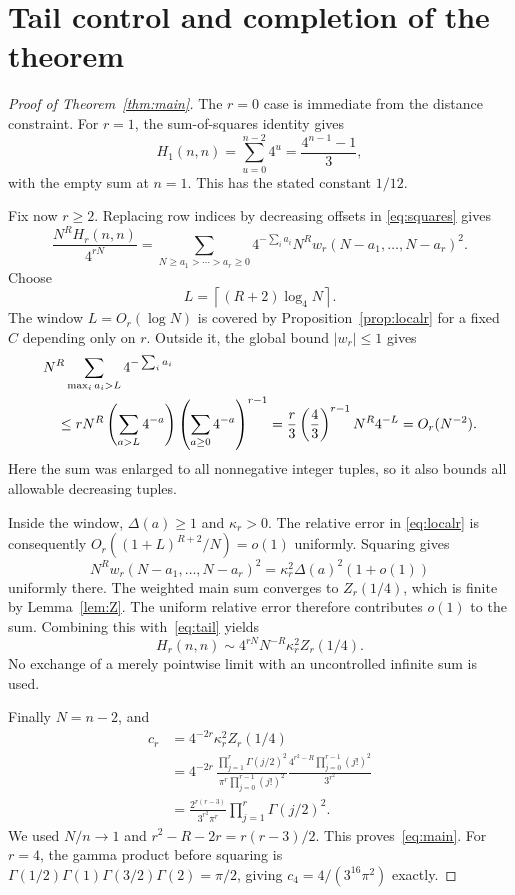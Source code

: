 \documentclass[11pt]{article}
\theoremstyle{remark}
\begin{document}
\section{Tail control and completion of the theorem}

\begin{proof}[Proof of Theorem~\ref{thm:main}]
The $r=0$ case is immediate from the distance constraint. For $r=1$, the
sum-of-squares identity gives
\[
 H_1(n,n)=\sum_{u=0}^{n-2}4^u=\frac{4^{n-1}-1}{3},
\]
with the empty sum at $n=1$. This has the stated constant $1/12$.

Fix now $r\ge2$. Replacing row indices by decreasing offsets in
\eqref{eq:squares} gives
\begin{equation}\label{eq:normalH}
 \frac{N^RH_r(n,n)}{4^{rN}}
 =\sum_{N\ge a_1>\cdots>a_r\ge0}
       4^{-\sum_i a_i}N^Rw_r(N-a_1,\ldots,N-a_r)^2.
\end{equation}
Choose
\[
 L=\left\lceil(R+2)\log_4 N\right\rceil.
\]
The window $L=O_r(\log N)$ is covered by Proposition~\ref{prop:localr} for a
fixed $C$ depending only on $r$. Outside it, the global bound $|w_r|\le1$ gives
\begin{align}
 &N^R\sum_{\max_i a_i>L}4^{-\sum_i a_i}\notag\\
 &\quad\le rN^R\left(\sum_{a>L}4^{-a}\right)
                     \left(\sum_{a\ge0}4^{-a}\right)^{r-1}
 =\frac r3\left(\frac43\right)^{r-1}N^R4^{-L}
 =O_r(N^{-2}).\label{eq:tail}
\end{align}
Here the sum was enlarged to all nonnegative integer tuples, so it also bounds
all allowable decreasing tuples.

Inside the window, $\Delta(a)\ge1$ and $\kappa_r>0$. The relative error in
\eqref{eq:localr} is consequently
$O_r((1+L)^{R+2}/N)=o(1)$ uniformly. Squaring gives
\[
 N^Rw_r(N-a_1,\ldots,N-a_r)^2
 =\kappa_r^2\Delta(a)^2(1+o(1))
\]
uniformly there. The weighted main sum converges to $Z_r(1/4)$, which is finite
by Lemma~\ref{lem:Z}. The uniform relative error therefore contributes $o(1)$
to the sum. Combining this with~\eqref{eq:tail} yields
\begin{equation}\label{eq:Nlimit}
 H_r(n,n)\sim4^{rN}N^{-R}\kappa_r^2 Z_r(1/4).
\end{equation}
No exchange of a merely pointwise limit with an uncontrolled infinite sum is
used.

Finally $N=n-2$, and
\begin{align*}
 c_r
 &=4^{-2r}\kappa_r^2 Z_r(1/4)\\
 &=4^{-2r}\,
 \frac{\prod_{j=1}^r\Gamma(j/2)^2}{\pi^r\prod_{j=0}^{r-1}(j!)^2}
 \frac{4^{r^2-R}\prod_{j=0}^{r-1}(j!)^2}{3^{r^2}}\\
 &=\frac{2^{r(r-3)}}{3^{r^2}\pi^r}\prod_{j=1}^r\Gamma(j/2)^2.
\end{align*}
We used $N/n\to1$ and $r^2-R-2r=r(r-3)/2$. This proves~\eqref{eq:main}.
For $r=4$, the gamma product before squaring is
$\Gamma(1/2)\Gamma(1)\Gamma(3/2)\Gamma(2)=\pi/2$, giving
$c_4=4/(3^{16}\pi^2)$ exactly.
\end{proof}
\end{document}
